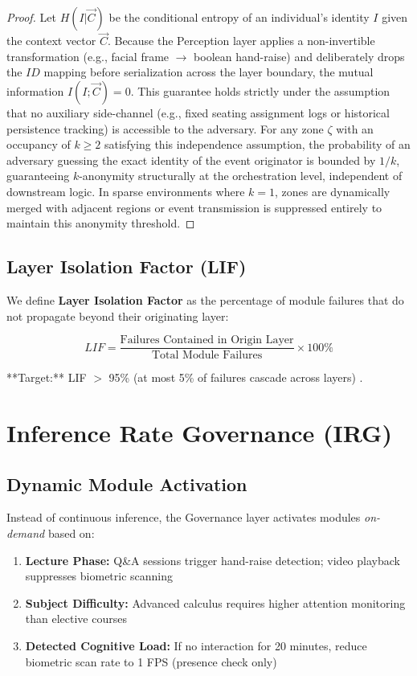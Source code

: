 \documentclass[conference]{IEEEtran}
\begin{document}
\begin{proof}
Let $H(I | \vec{C})$ be the conditional entropy of an individual's identity $I$ given the context vector $\vec{C}$. Because the Perception layer applies a non-invertible transformation (e.g., facial frame $\to$ boolean hand-raise) and deliberately drops the $ID$ mapping before serialization across the layer boundary, the mutual information $I(I; \vec{C}) = 0$. This guarantee holds strictly under the assumption that no auxiliary side-channel (e.g., fixed seating assignment logs or historical persistence tracking) is accessible to the adversary. For any zone $\zeta$ with an occupancy of $k \ge 2$ satisfying this independence assumption, the probability of an adversary guessing the exact identity of the event originator is bounded by $1/k$, guaranteeing $k$-anonymity structurally at the orchestration level, independent of downstream logic. In sparse environments where $k=1$, zones are dynamically merged with adjacent regions or event transmission is suppressed entirely to maintain this anonymity threshold.
\end{proof}

\subsection{Layer Isolation Factor (LIF)}
We define \textbf{Layer Isolation Factor} as the percentage of module failures that do not propagate beyond their originating layer:

\begin{equation}
LIF = \frac{\text{Failures Contained in Origin Layer}}{\text{Total Module Failures}} \times 100\%
\end{equation}

**Target:** LIF $>$ 95\% (at most 5\% of failures cascade across layers) \cite{b18}.

\section{Inference Rate Governance (IRG)}

\subsection{Dynamic Module Activation}
Instead of continuous inference, the Governance layer activates modules \textit{on-demand} based on:
\begin{enumerate}
    \item \textbf{Lecture Phase:} Q\&A sessions trigger hand-raise detection; video playback suppresses biometric scanning
    \item \textbf{Subject Difficulty:} Advanced calculus requires higher attention monitoring than elective courses
    \item \textbf{Detected Cognitive Load:} If no interaction for 20 minutes, reduce biometric scan rate to 1 FPS (presence check only)
\end{enumerate}
\end{document}
